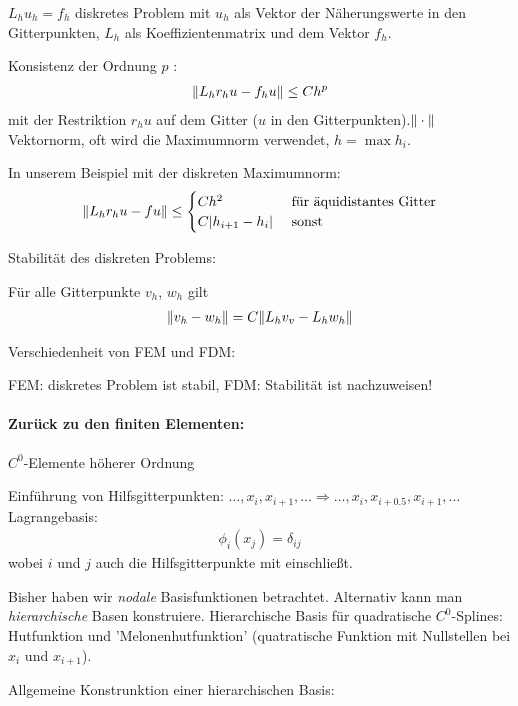 $L_h u_h = f_h$ diskretes Problem mit $u_h$ als Vektor der Näherungswerte in den Gitterpunkten, $L_h$ als Koeffizientenmatrix und dem Vektor $f_h$.
\begin{definition}
  Konsistenz der Ordnung $p$ :
  \begin{align*}
    \|L_h r_h u - f_hu\| \leq C h^p
  \end{align*}
mit der Restriktion $r_h u$ auf dem Gitter ($u$ in den Gitterpunkten).$\|\cdot\| $ Vektornorm, oft wird die Maximumnorm verwendet, $h = \max h_i$.
\end{definition}
In unserem Beispiel mit der diskreten Maximumnorm:
\begin{align*}
\|  L_hr_h u - fu \| \leq
\begin{cases}
  Ch^2 & \text{ für äquidistantes Gitter}\\
C|h_{i+1}-h_i| & \text{ sonst}
\end{cases}
\end{align*}
\begin{definition}
  Stabilität des diskreten Problems:

Für alle Gitterpunkte $v_h$, $w_h$ gilt
\begin{align*}
  \|v_h - w_h\| = C \|L_hv_v - L_hw_h\|
\end{align*}
\end{definition}

Verschiedenheit von FEM und FDM:

 FEM: diskretes Problem ist stabil, FDM: Stabilität ist nachzuweisen!

 \paragraph{Zurück zu den finiten Elementen:} $C^0$-Elemente höherer Ordnung

Einführung von Hilfsgitterpunkten: $\dots, x_i, x_{i+1}, \dots \Rightarrow \dots, x_i,x_{i+0.5}, x_{i+1}, \dots$
Lagrangebasis:
\begin{align*}
  \phi_i(x_j) = \delta_{ij} 
\end{align*}
wobei $i$ und $j$ auch die Hilfsgitterpunkte mit einschließt.

Bisher haben wir \emph{nodale} Basisfunktionen betrachtet. 
Alternativ kann man \emph{hierarchische} Basen konstruiere. Hierarchische Basis für quadratische $C^0$-Splines: Hutfunktion und 'Melonenhutfunktion' (quatratische Funktion mit Nullstellen bei $x_i$ und $x_{i+1}$).

Allgemeine Konstrunktion einer hierarchischen Basis:

